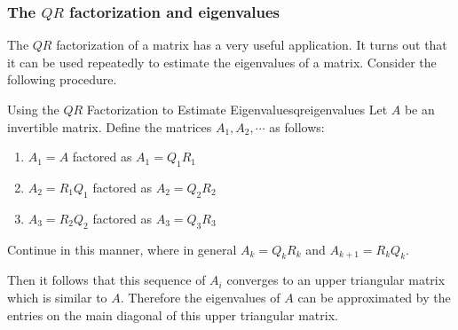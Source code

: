 \subsubsection{The $QR$ factorization and eigenvalues}

The $QR$ factorization of a matrix has a very useful application. It turns out that it can be used repeatedly to estimate the eigenvalues of a matrix. Consider the following procedure.

\begin{procedure}{Using the $QR$ Factorization to Estimate Eigenvalues}{qreigenvalues}
Let $A$ be an invertible matrix. Define the matrices $A_1, A_2, \cdots$ as follows:
\begin{enumerate}
\item 
$A_1 = A$ factored as $A_1 = Q_1R_1$
\item 
$A_2 = R_1Q_1$ factored as $A_2 = Q_2R_2$
\item 
$A_3 = R_2Q_2$ factored as $A_3 = Q_3R_3$
\end{enumerate}

Continue in this manner, where in general $A_k = Q_kR_k$ and $A_{k+1} = R_kQ_k$. 

Then it follows that this sequence of $A_i$ converges to an upper triangular matrix which is similar to $A$. Therefore the eigenvalues of $A$ can be approximated by the entries on the main diagonal of this upper triangular matrix. 
\end{procedure}